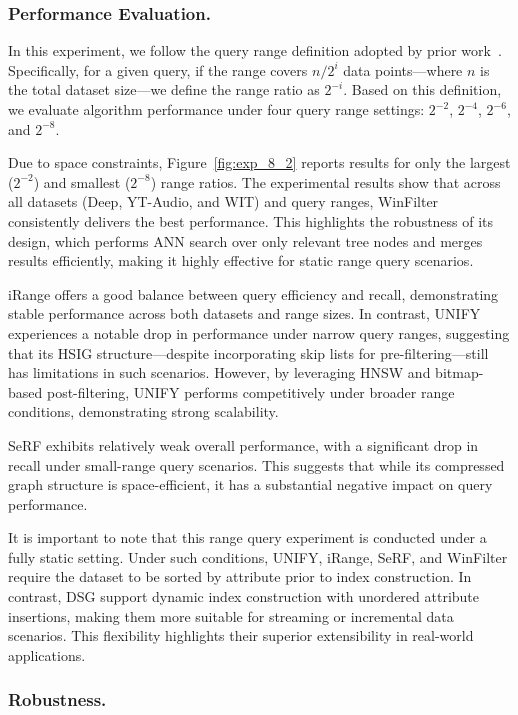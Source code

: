 \documentclass[sigconf, nonacm]{acmart}
\begin{document}
\begin{sloppypar}
\subsubsection{Performance Evaluation. }

In this experiment, we follow the query range definition adopted by prior work~\cite{HQI}. Specifically, for a given query, if the range covers $n/2^i$ data points—where $n$ is the total dataset size—we define the range ratio as $2^{-i}$. Based on this definition, we evaluate algorithm performance under four query range settings: $2^{-2}$, $2^{-4}$, $2^{-6}$, and $2^{-8}$.

Due to space constraints, Figure~\ref{fig:exp_8_2} reports results for only the largest ($2^{-2}$) and smallest ($2^{-8}$) range ratios. The experimental results show that across all datasets (Deep, YT-Audio, and WIT) and query ranges, WinFilter consistently delivers the best performance. This highlights the robustness of its design, which performs ANN search over only relevant tree nodes and merges results efficiently, making it highly effective for static range query scenarios.

iRange offers a good balance between query efficiency and recall, demonstrating stable performance across both datasets and range sizes. In contrast, UNIFY experiences a notable drop in performance under narrow query ranges, suggesting that its HSIG structure—despite incorporating skip lists for pre-filtering—still has limitations in such scenarios. However, by leveraging HNSW and bitmap-based post-filtering, UNIFY performs competitively under broader range conditions, demonstrating strong scalability.

SeRF exhibits relatively weak overall performance, with a significant drop in recall under small-range query scenarios. This suggests that while its compressed graph structure is space-efficient, it has a substantial negative impact on query performance.

It is important to note that this range query experiment is conducted under a fully static setting. Under such conditions, UNIFY, iRange, SeRF, and WinFilter require the dataset to be sorted by attribute prior to index construction. In contrast, DSG  support dynamic index construction with unordered attribute insertions, making them more suitable for streaming or incremental data scenarios. This flexibility highlights their superior extensibility in real-world applications.
\subsubsection{Robustness.}


\end{sloppypar}
\end{document}
